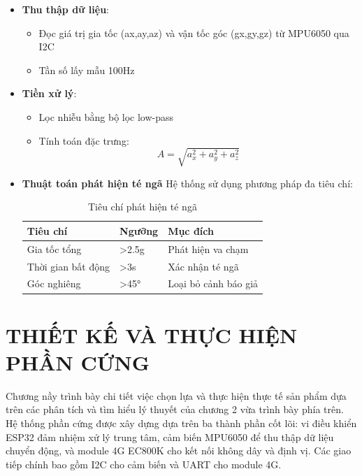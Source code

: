 \documentclass[a4paper,12pt]{report}
\begin{document}
	
	\begin{itemize}
		\item \textbf{Thu thập dữ liệu}:
		\begin{itemize}
			\item Đọc giá trị gia tốc (ax,ay,az) và vận tốc góc (gx,gy,gz) từ MPU6050 qua I2C
			\item Tần số lấy mẫu 100Hz
		\end{itemize}
		
		\item \textbf{Tiền xử lý}:
		\begin{itemize}
			\item Lọc nhiễu bằng bộ lọc low-pass
			\item Tính toán đặc trưng:
			\begin{equation}
				A = \sqrt{a_x^2 + a_y^2 + a_z^2}
			\end{equation}
		\end{itemize}
		
		
		\item\textbf{Thuật toán phát hiện té ngã}
		Hệ thống sử dụng phương pháp đa tiêu chí:
		
		\begin{table}[h]
			\centering
			\caption{Tiêu chí phát hiện té ngã}
			\begin{tabular}{|l|l|l|}
				\hline
				\textbf{Tiêu chí} & \textbf{Ngưỡng} & \textbf{Mục đích} \\ \hline
				Gia tốc tổng & >2.5g & Phát hiện va chạm \\ \hline
				Thời gian bất động & >3s & Xác nhận té ngã \\ \hline
				Góc nghiêng & >45° & Loại bỏ cảnh báo giả \\ \hline
			\end{tabular}
		\end{table}
		
		
	\end{itemize}
	
	\chapter{THIẾT KẾ VÀ THỰC HIỆN PHẦN CỨNG}
	Chương nầy trình bày chi tiết việc chọn lựa và thực hiện thực tế sản phẩm dựa trên các phân tích và tìm hiểu lý thuyết của chương 2 vừa trình bày phía trên. Hệ thống phần cứng được xây dựng dựa trên ba thành phần cốt lõi: vi điều khiển ESP32 đảm nhiệm xử lý trung tâm, cảm biến MPU6050 để thu thập dữ liệu chuyển động, và module 4G EC800K cho kết nối không dây và định vị. Các giao tiếp chính bao gồm I2C cho cảm biến và UART cho module 4G.
	
\end{document}
